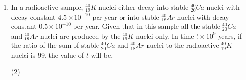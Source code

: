 
\begin{enumerate}
    \item In a radioactive sample, \( _{19}^{40}K \) nuclei either decay into stable \( _{20}^{40}Ca \) nuclei with decay constant \( 4.5 \times 10^{-10} \) per year or into stable \( _{18}^{40}Ar \) nuclei with decay constant \( 0.5 \times 10^{-10} \) per year. Given that in this sample all the stable \( _{20}^{40}Ca \) and \( _{18}^{40}Ar \) nuclei are produced by the \( _{19}^{40}K \) nuclei only. In time \( t \times 10^{9} \) years, if the ratio of the sum of stable \( _{20}^{40}Ca \) and \( _{18}^{40}Ar \) nuclei to the radioactive \( _{19}^{40}K \) nuclei is 99, the value of \( t \) will be,\\
    [Given: \( \ln 10 = 2.3 \)]
        \begin{tasks}(2)
        \end{tasks}
\end{enumerate}
